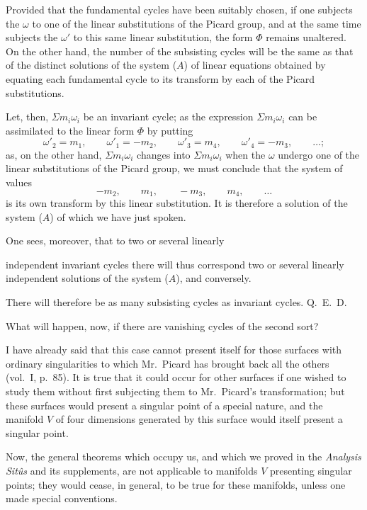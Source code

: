 \documentclass{article}
\begin{document}
Provided that the fundamental cycles have been suitably chosen, if one subjects the $\omega$ to one of the linear substitutions of the Picard group, and at the same time subjects the $\omega'$ to this same linear substitution, the form $\Phi$ remains unaltered. On the other hand, the number of the subsisting cycles will be the same as that of the distinct solutions of the system ($A$) of linear equations obtained by equating each fundamental cycle to its transform by each of the Picard substitutions.

Let, then, $\Sigma m_{i}\omega_{i}$ be an invariant cycle; as the expression $\Sigma m_{i}\omega_{i}$ can be assimilated to the linear form $\Phi$ by putting
\[ \omega'_{2} = m_{1}, \qquad \omega'_{1} = -m_{2}, \qquad \omega'_{3} = m_{4}, \qquad \omega'_{4} = -m_{3}, \qquad \ldots; \]
as, on the other hand, $\Sigma m_{i}\omega_{i}$ changes into $\Sigma m_{i}\omega_{i}$ when the $\omega$ undergo one of the linear substitutions of the Picard group, we must conclude that the system of values
\[ -m_{2}, \qquad m_{1}, \qquad -m_{3}, \qquad m_{4}, \qquad \ldots \]
is its own transform by this linear substitution. It is therefore a solution of the system ($A$) of which we have just spoken.

One sees, moreover, that to two or several linearly

independent invariant cycles there will thus correspond two or several linearly independent solutions of the system ($A$), and conversely.

There will therefore be as many subsisting cycles as invariant cycles. Q.~E.~D.

What will happen, now, if there are vanishing cycles of the second sort?

I have already said that this case cannot present itself for those surfaces with ordinary singularities to which Mr.~Picard has brought back all the others (vol.\ I, p.\ 85). It is true that it could occur for other surfaces if one wished to study them without first subjecting them to Mr.~Picard's transformation; but these surfaces would present a singular point of a special nature, and the manifold $V$ of four dimensions generated by this surface would itself present a singular point.

Now, the general theorems which occupy us, and which we proved in the \emph{Analysis Sitûs} and its supplements, are not applicable to manifolds $V$ presenting singular points; they would cease, in general, to be true for these manifolds, unless one made special conventions.
\end{document}
